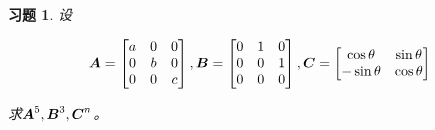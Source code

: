 \documentclass{ctexart}
\newtheorem{problem}{习题}[section]
\begin{document}
\begin{problem}
设

\begin{equation*}
    \boldsymbol{A}=\begin{bmatrix}a&0&0\\0&b&0\\0&0&c\end{bmatrix},
    \boldsymbol{B}=\begin{bmatrix}0&1&0\\0&0&1\\0&0&0\end{bmatrix},
    \boldsymbol{C}=\begin{bmatrix}\cos \theta&\sin \theta\\-\sin \theta&\cos \theta\end{bmatrix}
\end{equation*}

求\(\boldsymbol{A}^5,\boldsymbol{B}^3,\boldsymbol{C}^n\)。
\end{problem}
\end{document}
